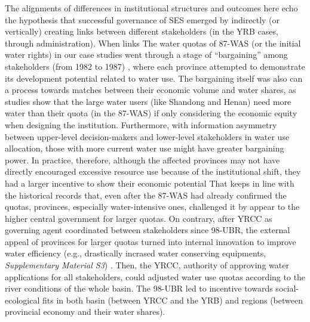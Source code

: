 The alignments of differences in institutional structures and outcomes here echo the hypothesis that successful governance of SES emerged by indirectly (or vertically) creating links between different stakeholders (in the YRB cases, through administration).
When links The water quotas of 87-WAS (or the initial water rights) in our case studies went through a stage of ``bargaining'' among stakeholders (from 1982 to 1987) \cite{wang2019a, wang2019d}, where each province attempted to demonstrate its development potential related to water use.
The bargaining itself was also can a process towards matches between their economic volume and water shares, as studies show that the large water users (like Shandong and Henan) need more water than their quota (in the 87-WAS) if only considering the economic equity when designing the institution.
Furthermore, with information asymmetry between upper-level decision-makers and lower-level stakeholders in water use allocation, those with more current water use might have greater bargaining power.
In practice, therefore, although the affected provinces may not have directly encouraged excessive resource use because of the institutional shift, they had a larger incentive to show their economic potential
That keeps in line with the historical records that, even after the 87-WAS had already confirmed the quotas, provinces, especially water-intensive ones, challenged it by appear to the higher central government for larger quotas.
On contrary, after YRCC as governing agent coordinated between stakeholders since 98-UBR, the external appeal of provinces for larger quotas turned into internal innovation to improve water efficiency (e.g., drastically incrased water conserving equipments, \textit{Supplementary Material S3})
\cite{krieger1955, ostrom1990}.
Then, the YRCC, authority of approving water applications for all stakeholders, could adjusted water use quotas according to the river conditions of the whole basin.
The 98-UBR led to incentive towards social-ecological fits in both basin (between YRCC and the YRB) and regions (between provincial economy and their water shares).
